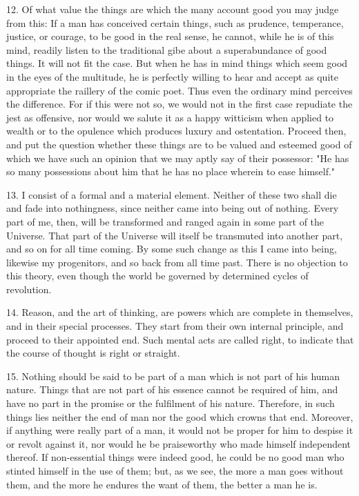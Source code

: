 \documentclass{book}
\begin{document}
12. Of what value the things are which the many account good you may
judge from this: If a man has conceived certain things, such as
prudence, temperance, justice, or courage, to be good in the real
sense, he cannot, while he is of this mind, readily listen to the
traditional gibe about a superabundance of good things. It will not
fit the case. But when he has in mind things which seem good in the
eyes of the multitude, he is perfectly willing to hear and accept as
quite appropriate the raillery of the comic poet. Thus even the
ordinary mind perceives the difference. For if this were not so, we
would not in the first case repudiate the jest as offensive, nor would
we salute it as a happy witticism when applied to wealth or to the
opulence which produces luxury and ostentation. Proceed then, and put
the question whether these things are to be valued and esteemed good
of which we have such an opinion that we may aptly say of their
possessor: "He has so many possessions about him that he has no place
wherein to ease himself."

13. I consist of a formal and a material element. Neither of these two
shall die and fade into nothingness, since neither came into being out
of nothing. Every part of me, then, will be transformed and ranged
again in some part of the Universe. That part of the Universe will
itself be transmuted into another part, and so on for all time
coming. By some such change as this I came into being, likewise my
progenitors, and so back from all time past. There is no objection to
this theory, even though the world be governed by determined cycles of
revolution.

14. Reason, and the art of thinking, are powers which are complete in
themselves, and in their special processes. They start from their own
internal principle, and proceed to their appointed end. Such mental
acts are called right, to indicate that the course of thought is right
or straight.

15. Nothing should be said to be part of a man which is not part of
his human nature. Things that are not part of his essence cannot be
required of him, and have no part in the promise or the fulfilment of
his nature. Therefore, in such things lies neither the end of man nor
the good which crowns that end. Moreover, if anything were really part
of a man, it would not be proper for him to despise it or revolt
against it, nor would he be praiseworthy who made himself independent
thereof. If non-essential things were indeed good, he could be no good
man who stinted himself in the use of them; but, as we see, the more a
man goes without them, and the more he endures the want of them, the
better a man he is.
\end{document}
